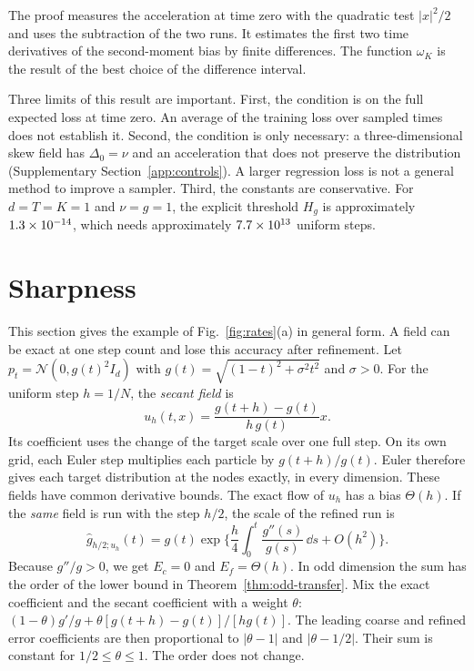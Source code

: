 The proof measures the acceleration at time zero with the
quadratic test $|x|^2/2$ and uses the subtraction of the two runs. It
estimates the first two time derivatives of the second-moment bias by
finite differences. The function $\omega_K$ is the result of the best
choice of the difference interval.

Three limits of this result are important. First, the condition is on the
full expected loss at time zero. An average of the training loss over
sampled times does not establish it. Second, the condition is only
necessary: a three-dimensional skew field has $\Delta_0=\nu$ and an
acceleration that does not preserve the distribution (Supplementary
Section~\ref{app:controls}). A larger regression loss is not a general
method to improve a sampler. Third, the constants are conservative. For
$d=T=K=1$ and $\nu=g=1$, the explicit threshold $H_g$ is approximately
$1.3\times10^{-14}$, which needs approximately $7.7\times10^{13}$ uniform
steps.

\section{Sharpness}
\label{sec:sharpness}
This section gives the example of Fig.~\ref{fig:rates}(a) in general
form. A field can be exact at one step count and lose this accuracy
after refinement. Let $p_t=\mathcal N(0,g(t)^2I_d)$ with
$g(t)=\sqrt{(1-t)^2+\sigma^2t^2}$ and $\sigma>0$. For the uniform step
$h=1/N$, the \emph{secant field} is\AIassistance
\begin{equation}\label{eq:secant}
 u_h(t,x)=\frac{g(t+h)-g(t)}{h\,g(t)}x.
\end{equation}
Its coefficient uses the change of the target scale over one full step.
On its own grid, each Euler step multiplies each particle by
$g(t+h)/g(t)$. Euler therefore gives each target distribution at the
nodes exactly, in every dimension. These fields have common derivative
bounds. The exact flow of $u_h$ has a bias $\Theta(h)$. If the
\emph{same} field is run with the step $h/2$, the scale of the refined
run is
\begin{equation}\label{eq:sharp-transfer}
 \widehat g_{h/2;u_h}(t)=g(t)\exp\Big\{\frac h4\int_0^t
 \frac{g''(s)}{g(s)}\,\dd s+O(h^2)\Big\}.
\end{equation}
Because $g''/g>0$, we get $E_c=0$ and $E_f=\Theta(h)$. In odd dimension
the sum has the order of the lower bound in
Theorem~\ref{thm:odd-transfer}. Mix the exact coefficient and the
secant coefficient with a weight $\theta$:
$(1-\theta)g'/g+\theta[g(t+h)-g(t)]/[hg(t)]$. The leading coarse and
refined error coefficients are then proportional to $|\theta-1|$ and
$|\theta-1/2|$. Their sum is constant for $1/2\le\theta\le1$. The order
does not change.

